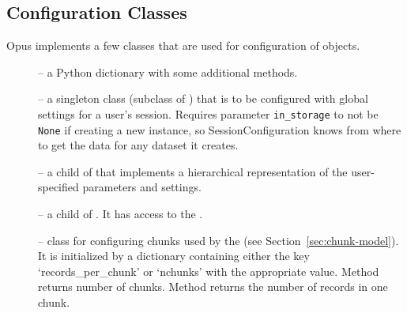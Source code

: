 \subsection{Configuration Classes}
\label{sec:resources} 
%
Opus implements a few classes that are used for configuration of objects.
\begin{description}
\item[] --  a Python dictionary with some additional methods.
\item[] --  a singleton class
        (subclass of ) that is to be configured
        with global settings for a user's session.  Requires parameter
        \verb|in_storage| to not be \verb|None| if creating a new instance, so
        SessionConfiguration knows from where to get the data for any dataset it
        creates.
\item[] --  
  a child of  that implements a hierarchical
        representation of the user-specified parameters and settings.
\item[] --  a child of . It has access to the
.
\item[] --  class for configuring chunks used by the  (see 
Section~\ref{sec:chunk-model}). It is initialized by a dictionary containing either the key `records_per_chunk' or
`nchunks' with the appropriate value. Method  returns number of chunks. Method 
returns the number of records in one chunk.
\end{description}


